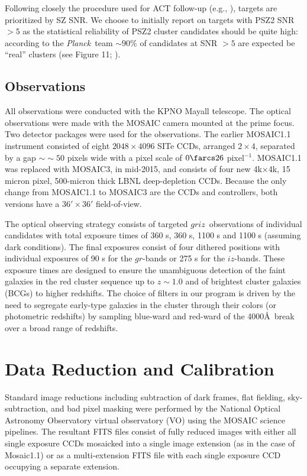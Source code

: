 \documentclass[apj, revtex4-1]{emulateapj}
\newcommand{\planck}{\textit{Planck}}
\newcommand{\sdssg}{\hbox{$g$}}
\newcommand{\sdssr}{\hbox{$r$}}
\newcommand{\sdssi}{\hbox{$i$}}
\newcommand{\sdssz}{\hbox{$z$}}
\newcommand{\perpixel}{\hbox{pixel$^{-1}$}}
\newcommand{\eg}{e.g.}
\newcommand{\citeeg}[1]{(\eg, \citealt{#1})}
\begin{document}

Following closely the procedure used for ACT follow-up \citeeg{Menanteau2013}, targets are prioritized by SZ SNR. We choose to initially report on targets with PSZ2 SNR $>5$ as the statistical reliability of PSZ2 cluster candidates should be quite high: according to the \planck\ team $\sim90$\% of candidates at SNR $>5$ are expected be ``real'' clusters (see Figure 11; \citealt{PlanckCollaboration2015a}).

\subsection{Observations}\label{sec: observations}
All observations were conducted with the KPNO Mayall telescope. The optical observations were made with the MOSAIC camera mounted at the prime focus. Two detector packages were used for the observations. The earlier MOSAIC1.1 instrument consisted of eight $2048\times4096$ SITe CCDs, arranged $2\times4$, separated by a gap $∼\sim50$ pixels wide with a pixel scale of $0\farcs26$ \perpixel. MOSAIC1.1 was replaced with MOSAIC3, in mid-2015, and consists of four new 4k$\times$4k, 15 micron pixel, 500-micron thick LBNL deep-depletion CCDs. Because the only change from MOSAIC1.1 to MOSAIC3 are the CCDs and controllers, both versions have a $36' \times 36'$ field-of-view.

The optical observing strategy consists of targeted \sdssg\sdssr\sdssi\sdssz\ observations of individual candidates with total exposure times of 360 s, 360 s, 1100 s and 1100 s (assuming dark conditions). The final exposures consist of four dithered positions with individual exposures of 90 s for the \sdssg\sdssr-bands or 275 s for the \sdssi\sdssz-bands. These exposure times are designed to ensure the unambiguous detection of the faint galaxies in the red cluster sequence up to $z \sim 1.0$ and of brightest cluster galaxies (BCGs) to higher redshifts. The choice of filters in our program is driven by the need to segregate early-type galaxies in the cluster through their colors (or photometric redshifts) by sampling blue-ward and red-ward of the 4000\AA\ break over a broad range of redshifts.

\section{Data Reduction and Calibration}\label{sec:data reduction}
Standard image reductions including subtraction of dark frames, flat fielding, sky-subtraction, and bad pixel masking were performed by the National Optical Astronomy Observatory virtual observatory (VO) using the MOSAIC \citep{Valdes2007} science pipelines. The resultant FITS files consist of fully reduced images with either all single exposure CCDs mosaicked into a single image extension (as in the case of Mosaic1.1) or as a multi-extension FITS file with each single exposure CCD occupying a separate extension.
\end{document}
